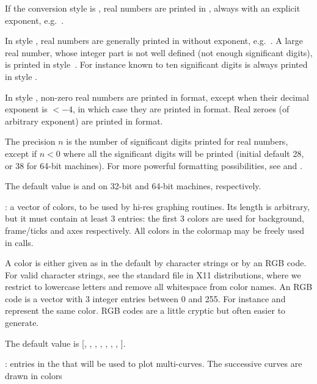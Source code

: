 \item If the conversion style is , real numbers are printed in
, always with an explicit exponent,
e.g.~.

\item In style , real numbers are generally printed in  without exponent, e.g.~. A large
real number, whose integer part is not well defined (not enough significant
digits), is printed in style~. For instance  known to
ten significant digits is always printed in style .

\item In style , non-zero real numbers are printed in  format,
except when their decimal exponent is $< -4$, in which case they are printed in
 format. Real zeroes (of arbitrary exponent) are printed in 
format.

The precision $n$ is the number of significant digits printed for real
numbers, except if $n<0$ where all the significant digits will be printed
(initial default 28, or 38 for 64-bit machines). For more powerful formatting
possibilities, see  and .

The default value is  and  on 32-bit and
64-bit machines, respectively.

: \label{se:def,graphcolormap}a vector of colors, to be
used by hi-res graphing routines. Its length is arbitrary, but it must
contain at least 3 entries: the first 3 colors are used for background,
frame/ticks and axes respectively. All colors in the colormap may be freely
used in  calls.

A color is either given as in the default by character strings or by an RGB
code. For valid character strings, see the standard  file in X11
distributions, where we restrict to lowercase letters and remove all
whitespace from color names. An RGB code is a vector with 3 integer entries
between 0 and 255. For instance \kbd{[250, 235, 215]} and  represent the same color. RGB codes are a little cryptic but often
easier to generate.

The default value is [, , ,
, , , ,
].

: \label{se:def,graphcolors}entries in the
 that will be used to plot multi-curves. The successive
curves are drawn in colors

